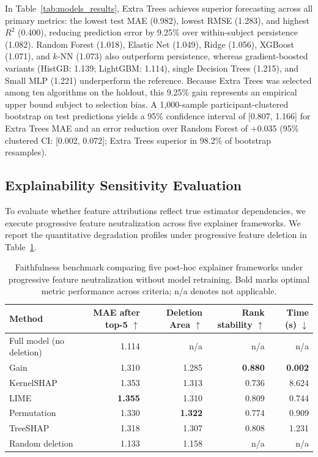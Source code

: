 \documentclass[runningheads]{llncs}
\begin{document}
In Table~\ref{tab:models_results}, Extra Trees achieves superior forecasting across all primary metrics: the lowest test MAE (0.982), lowest RMSE (1.283), and highest $R^2$ (0.400), reducing prediction error by 9.25\% over within-subject persistence (1.082). Random Forest (1.018), Elastic Net (1.049), Ridge (1.056), XGBoost (1.071), and $k$-NN (1.073) also outperform persistence, whereas gradient-boosted variants (HistGB: 1.139; LightGBM: 1.114), single Decision Trees (1.215), and Small MLP (1.221) underperform the reference. Because Extra Trees was selected among ten algorithms on the holdout, this 9.25\% gain represents an empirical upper bound subject to selection bias. A 1,000-sample participant-clustered bootstrap on test predictions yields a 95\% confidence interval of [0.807, 1.166] for Extra Trees MAE and an error reduction over Random Forest of +0.035 (95\% clustered CI: [0.002, 0.072]; Extra Trees superior in 98.2\% of bootstrap resamples).

\subsection{Explainability Sensitivity Evaluation}
To evaluate whether feature attributions reflect true estimator dependencies, we execute progressive feature neutralization across five explainer frameworks. We report the quantitative degradation profiles under progressive feature deletion in Table~\ref{tab:explainers}.

\begin{table}[H]
\centering
\caption{Faithfulness benchmark comparing five post-hoc explainer frameworks under progressive feature neutralization without model retraining. Bold marks optimal metric performance across criteria; n/a denotes not applicable.}
\label{tab:explainers}
\begingroup\small\setlength{\tabcolsep}{3.5pt}
\begin{tabular*}{\linewidth}{@{\extracolsep{\fill}}lrrrr}
\toprule
Method & \shortstack{MAE after\\top-5 $\uparrow$} & \shortstack{Deletion\\Area $\uparrow$} & \shortstack{Rank\\stability $\uparrow$} & \shortstack{Time (s)\\$\downarrow$}\\
\midrule
Full model (no deletion) & 1.114 & n/a & n/a & n/a\\
Gain & 1.310 & 1.285 & \textbf{0.880} & \textbf{0.002}\\
KernelSHAP & 1.353 & 1.313 & 0.736 & 8.624\\
LIME & \textbf{1.355} & 1.310 & 0.809 & 0.744\\
Permutation & 1.330 & \textbf{1.322} & 0.774 & 0.909\\
TreeSHAP & 1.318 & 1.307 & 0.808 & 1.231\\
Random deletion & 1.133 & 1.158 & n/a & n/a\\
\bottomrule
\end{tabular*}\endgroup
\end{table}
\end{document}
